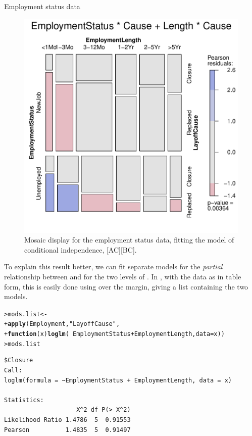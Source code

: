 \documentclass[10pt,krantz2]{krantz}\usepackage[]{graphicx}\usepackage[]{color}
\makeatletter
\newcommand{\hlstr}[1]{\textcolor[rgb]{0.192,0.494,0.8}{#1}}%
\newcommand{\hlopt}[1]{\textcolor[rgb]{0,0,0}{#1}}%
\newcommand{\hlstd}[1]{\textcolor[rgb]{0.345,0.345,0.345}{#1}}%
\newcommand{\hlkwa}[1]{\textcolor[rgb]{0.161,0.373,0.58}{\textbf{#1}}}%
\newcommand{\hlkwb}[1]{\textcolor[rgb]{0.69,0.353,0.396}{#1}}%
\newcommand{\hlkwc}[1]{\textcolor[rgb]{0.333,0.667,0.333}{#1}}%
\newcommand{\hlkwd}[1]{\textcolor[rgb]{0.737,0.353,0.396}{\textbf{#1}}}%
\newenvironment{kframe}{%
 \def\at@end@of@kframe{}%
 \ifinner\ifhmode%
  \def\at@end@of@kframe{\end{minipage}}%
  \begin{minipage}{\columnwidth}%
 \fi\fi%
 \def\FrameCommand##1{\hskip\@totalleftmargin \hskip-\fboxsep
 \colorbox{shadecolor}{##1}\hskip-\fboxsep
     \hskip-\linewidth \hskip-\@totalleftmargin \hskip\columnwidth}%
 \MakeFramed {\advance\hsize-\width
   \@totalleftmargin\z@ \linewidth\hsize
   \@setminipage}}%
 {\par\unskip\endMakeFramed%
 \at@end@of@kframe}
\newenvironment{knitrout}{}{} %
\renewenvironment{knitrout}{\small\renewcommand{\baselinestretch}{.85}}{} %
\makeatother
\begin{document}
\begin{Example}[employ]{Employment status data}
\begin{knitrout}
\begin{figure}[!htbp]
\centerline{\includegraphics[width=.6\textwidth]{ch05/fig/employ-mos2-1} }

\caption[Mosaic display for the employment status data, fitting the model of conditional independence]{Mosaic display for the employment status data, fitting the model of conditional independence, [AC][BC].}\label{fig:employ-mos2}
\end{figure}


\end{knitrout}

To explain this result better, we can fit separate models for the \emph{partial}
relationship between  and 
for the two levels of . In \R, with the  data
as in table form, this is easily done using  over the
 margin, giving a list containing the two  models.

\begin{knitrout}
\color{fgcolor}\begin{kframe}
\begin{alltt}
\hlstd{> }\hlstd{mods.list} \hlkwb{<-}
\hlstd{+ }  \hlkwd{apply}\hlstd{(Employment,} \hlstr{"LayoffCause"}\hlstd{,}
\hlstd{+ }        \hlkwa{function}\hlstd{(}\hlkwc{x}\hlstd{)} \hlkwd{loglm}\hlstd{(}\hlopt{~} \hlstd{EmploymentStatus} \hlopt{+} \hlstd{EmploymentLength,} \hlkwc{data} \hlstd{= x))}
\hlstd{> }\hlstd{mods.list}
\end{alltt}
\begin{verbatim}
$Closure
Call:
loglm(formula = ~EmploymentStatus + EmploymentLength, data = x)

Statistics:
                    X^2 df P(> X^2)
Likelihood Ratio 1.4786  5  0.91553
Pearson          1.4835  5  0.91497


\end{verbatim}
\end{kframe}
\end{knitrout}
\end{Example}
\end{document}
